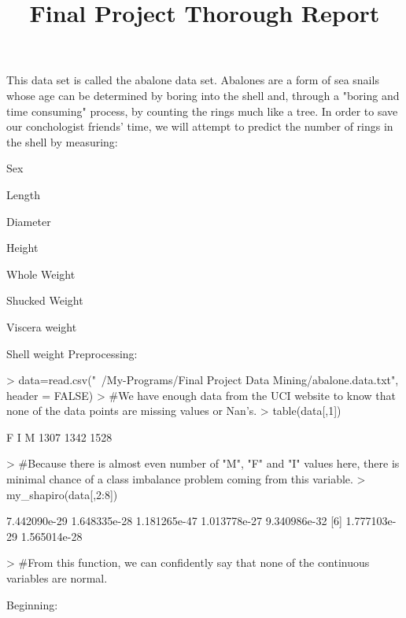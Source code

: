 \documentclass[letterpaper]{article}
\title{Final Project Thorough Report}
\begin{document}

\linenumbers
\paragraph{}This data set is called the abalone data set. Abalones are a form of sea snails whose age can be determined by boring into the shell and, through a "boring and time consuming" process, by counting the rings much like a tree. In order to save our conchologist friends' time, we will attempt to predict the number of rings in the shell by measuring:
\ben
  \item Sex
  \item Length
  \item Diameter
  \item Height
  \item Whole Weight
  \item Shucked Weight
  \item Viscera weight
  \item Shell weight
\een
Preprocessing:
\begin{Schunk}
\begin{Sinput}
> data=read.csv("~/My-Programs/Final Project Data Mining/abalone.data.txt", header = FALSE)
> #We have enough data from the UCI website to know that none of the data points are missing values or Nan's.
> table(data[,1])
\end{Sinput}
\begin{Soutput}
   F    I    M 
1307 1342 1528 
\end{Soutput}
\begin{Sinput}
> #Because there is almost even number of "M", "F" and "I" values here, there is minimal chance of a class imbalance problem coming from this variable.
> my_shapiro(data[,2:8])
\end{Sinput}
\begin{Soutput}
[1] 7.442090e-29 1.648335e-28 1.181265e-47 1.013778e-27 9.340986e-32
[6] 1.777103e-29 1.565014e-28
\end{Soutput}
\begin{Sinput}
> #From this function, we can confidently say that none of the continuous variables are normal.
\end{Sinput}
\end{Schunk}
Beginning:
\begin{Schunk}
\end{Schunk}
\end{document}
